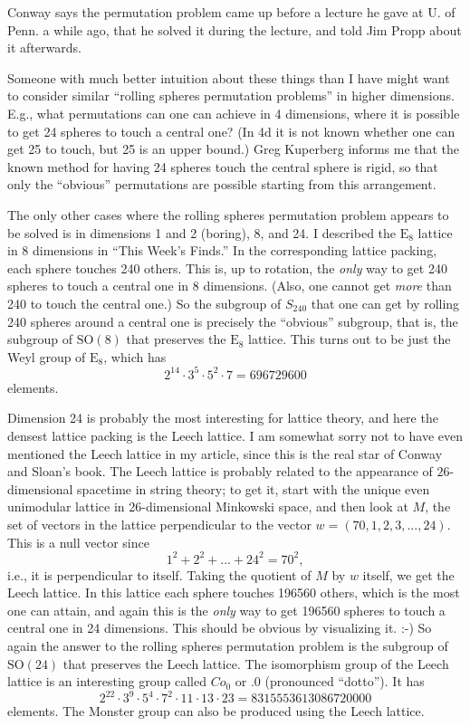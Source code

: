 \documentclass[12pt]{article}
\begin{document}
Conway says the permutation problem came up before a lecture he gave at
U. of Penn. a while ago, that he solved it during the lecture, and told
Jim Propp about it afterwards.

Someone with much better intuition about these things than I have might
want to consider similar ``rolling spheres permutation problems'' in
higher dimensions. E.g., what permutations can one can achieve in 4
dimensions, where it is possible to get 24 spheres to touch a central
one? (In 4d it is not known whether one can get 25 to touch, but 25 is
an upper bound.) Greg Kuperberg informs me that the known method for
having 24 spheres touch the central sphere is rigid, so that only the
``obvious'' permutations are possible starting from this arrangement.

The only other cases where the rolling spheres permutation problem
appears to be solved is in dimensions 1 and 2 (boring), 8, and 24. I
described the \(\mathrm{E}_8\) lattice in 8 dimensions in ``This Week's
Finds.'' In the corresponding lattice packing, each sphere touches 240
others. This is, up to rotation, the \emph{only} way to get 240 spheres
to touch a central one in 8 dimensions. (Also, one cannot get
\emph{more} than 240 to touch the central one.) So the subgroup of
\(S_{240}\) that one can get by rolling 240 spheres around a central one
is precisely the ``obvious'' subgroup, that is, the subgroup of
\(\mathrm{SO}(8)\) that preserves the \(\mathrm{E}_8\) lattice. This
turns out to be just the Weyl group of \(\mathrm{E}_8\), which has
\[2^{14}\cdot 3^5\cdot 5^2\cdot 7 = 696729600\] elements.

Dimension 24 is probably the most interesting for lattice theory, and
here the densest lattice packing is the Leech lattice. I am somewhat
sorry not to have even mentioned the Leech lattice in my article, since
this is the real star of Conway and Sloan's book. The Leech lattice is
probably related to the appearance of \(26\)-dimensional spacetime in
string theory; to get it, start with the unique even unimodular lattice
in 26-dimensional Minkowski space, and then look at \(M\), the set of
vectors in the lattice perpendicular to the vector
\(w = (70,1,2,3,...,24)\). This is a null vector since
\[1^2 + 2^2 + ... + 24^2 = 70^2,\] i.e., it is perpendicular to itself.
Taking the quotient of \(M\) by \(w\) itself, we get the Leech lattice.
In this lattice each sphere touches 196560 others, which is the most one
can attain, and again this is the \emph{only} way to get 196560 spheres
to touch a central one in 24 dimensions. This should be obvious by
visualizing it. :-) So again the answer to the rolling spheres
permutation problem is the subgroup of \(\mathrm{SO}(24)\) that
preserves the Leech lattice. The isomorphism group of the Leech lattice
is an interesting group called \(Co_0\) or \(.0\) (pronounced
``dotto''). It has
\[2^{22}\cdot 3^9\cdot 5^4\cdot 7^2\cdot 11\cdot 13\cdot 23 = 8315553613086720000\]
elements. The Monster group can also be produced using the Leech
lattice.
\end{document}
